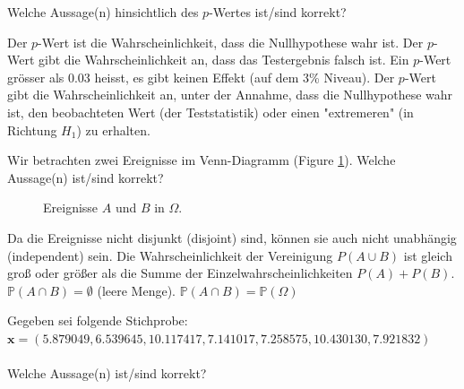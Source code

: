 \documentclass[10pt,addpoints,answers]{exam}
\begin{document}
\begin{questions}
\question Welche Aussage(n) hinsichtlich des $p$-Wertes ist/sind korrekt?\\

\begin{choices}
\choice Der $p$-Wert ist die Wahrscheinlichkeit, dass die Nullhypothese wahr ist.
\choice Der $p$-Wert gibt die Wahrscheinlichkeit an, dass das Testergebnis falsch ist.
\choice Ein $p$-Wert grösser als 0.03 heisst, es gibt keinen Effekt (auf dem 3\% Niveau).
\CorrectChoice Der $p$-Wert gibt die Wahrscheinlichkeit an, unter der Annahme, dass die 
Nullhypothese wahr ist, den beobachteten Wert (der Teststatistik) oder einen "extremeren" (in Richtung $H_1$)
zu erhalten.
\end{choices}

\question Wir betrachten zwei Ereignisse im Venn-Diagramm (Figure \ref{fig:venn_diagram}). 
Welche Aussage(n) ist/sind korrekt?

\begin{figure}[h!]
    \centering
    \caption{Ereignisse \(A\) und \(B\) in \(\Omega\).}
    \label{fig:venn_diagram}
\end{figure}

\begin{choices}
\choice Da die Ereignisse nicht disjunkt (disjoint) sind, können sie auch nicht unabhängig (independent) sein.
\choice Die Wahrscheinlichkeit der Vereinigung $P(A \cup B)$ ist gleich groß oder größer als die Summe der 
Einzelwahrscheinlichkeiten $P(A) + P(B)$.
\choice $\mathbb{P}(A \cap B) = \emptyset$ (leere Menge).
\choice $\mathbb{P}(A \cap B) = \mathbb{P}(\Omega)$
\end{choices}

\question Gegeben sei folgende Stichprobe: $ \mathbf{x} = (5.879049, 6.539645, 10.117417, 7.141017, 7.258575, 10.430130, 7.921832)$\\
\\
Welche Aussage(n) ist/sind korrekt?\\


\end{questions}
\end{document}
